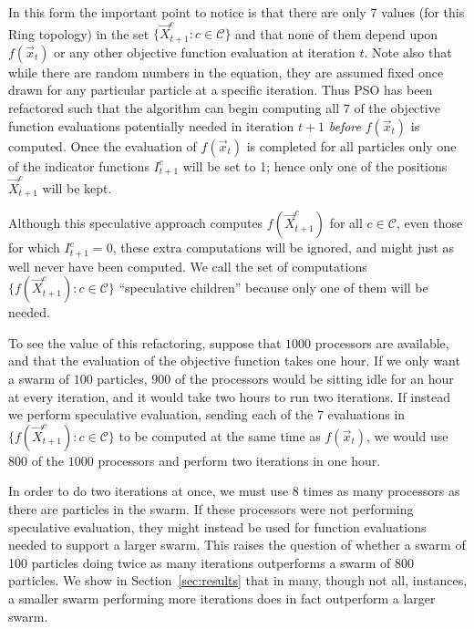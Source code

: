 \documentclass[smallcondensed]{svjour3}
\renewcommand{\sec}[1]{Section~\ref{sec:#1}}
\providecommand{\ppos}{\ensuremath{\Vec{x}}}
\providecommand{\ofunc}{\ensuremath{f}}
\providecommand{\indic}{\ensuremath{I}}
\providecommand{\specpos}{\ensuremath{\vec{X}}}
\providecommand{\caseset}{\ensuremath{\mathcal{C}}}
\providecommand{\casegen}{\ensuremath{c}}
\begin{document}
In this form the important point to notice is that there are only $7$ values
(for this Ring topology) in the set $\{\specpos_{t+1}^{\casegen}: \casegen \in
\caseset\}$ and that none of them depend upon $f(\ppos_t)$ or any other
objective function evaluation at iteration $t$.  Note also that while there are
random numbers in the equation, they are assumed fixed once drawn for any
particular particle at a specific iteration.  Thus PSO has been refactored such
that the algorithm can begin computing all $7$ of the objective function
evaluations potentially needed in iteration $t+1$ \emph{before} $f(\ppos_t)$ is
computed.  Once the evaluation of $f(\ppos_{t})$ is completed for all particles
only one of the indicator functions $\indic_{t+1}^{\casegen}$ will be set to 1;
hence only one of the positions $\specpos_{t+1}^\casegen$ will be kept.

Although this speculative approach computes $\ofunc(\specpos_{t+1}^{\casegen})$
for all $\casegen \in \caseset$, even those for which $\indic_{t+1}^{\casegen}
= 0$, these extra computations will be ignored, and might just as well never
have been computed.  We call the set of computations
$\{\ofunc(\specpos_{t+1}^{c}) : \casegen \in \caseset\}$ ``speculative
children'' because only one of them will be needed.

To see the value of this refactoring, suppose that $1000$ processors are
available, and that the evaluation of the objective function takes one hour.
If we only want a swarm of $100$ particles, $900$ of the processors would be
sitting idle for an hour at every iteration, and it would take two hours to run
two iterations.  If instead we perform speculative evaluation, sending each of
the $7$ evaluations in $\{\ofunc(\specpos_{t+1}^{c}) : \casegen \in \caseset\}$
to be computed at the same time as $\ofunc(\ppos_{t})$, we would use $800$ of
the $1000$ processors and perform two iterations in one hour.

In order to do two iterations at once, we must use 8 times as many processors
as there are particles in the swarm.  If these processors were not performing
speculative evaluation, they might instead be used for function evaluations
needed to support a larger swarm.  This raises the question of whether a swarm
of 100 particles doing twice as many iterations outperforms a swarm of 800
particles.  We show in \sec{results} that in many, though not all, instances, a
smaller swarm performing more iterations does in fact outperform a larger
swarm.
\end{document}

